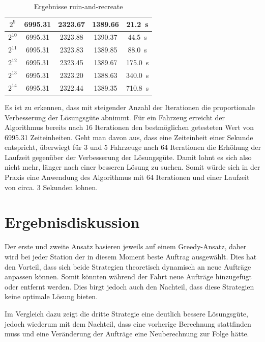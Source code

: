 \documentclass[ngerman]{tudscrreprt}
\begin{document}
\begin{table}[H]
\begin{tabular}{|c|c|c|c|c|}
    $2^9$                           & \num{6995.31} & \num{2323.67} & \num{1389.66} & \SI{21.2}{\s}        \\ \hline
    $2^{10}$                        & \num{6995.31} & \num{2323.88} & \num{1390.37} & \SI{44.5}{\s}        \\ \hline
    $2^{11}$                        & \num{6995.31} & \num{2323.83} & \num{1389.85} & \SI{88.0}{\s}        \\ \hline
    $2^{12}$                        & \num{6995.31} & \num{2323.45} & \num{1389.67} & \SI{175.0}{\s}       \\ \hline
    $2^{13}$                        & \num{6995.31} & \num{2323.20} & \num{1388.63} & \SI{340.0}{\s}       \\ \hline
    $2^{14}$                        & \num{6995.31} & \num{2322.44} & \num{1389.35} & \SI{710.8}{\s}       \\ \hline
    \end{tabular}
    \caption{Ergebnisse ruin-and-recreate}
    \label{table:ruin-and-recreate}
\end{table}
%
Es ist zu erkennen, dass mit steigender Anzahl der Iterationen die proportionale Verbesserung der Lösungsgüte abnimmt.
Für ein Fahrzeug erreicht der Algorithmus bereits nach 16 Iterationen den bestmöglichen getesteten Wert von \num{6995.31}
Zeiteinheiten. Geht man davon aus, dass eine Zeiteinheit einer Sekunde entspricht, überwiegt für 3 und 5 Fahrzeuge
nach 64 Iterationen die Erhöhung der Laufzeit gegenüber der Verbesserung der Lösungsgüte. Damit lohnt es sich also
nicht mehr, länger nach einer besseren Lösung zu suchen. Somit würde sich in der Praxis eine Anwendung des Algorithmus
mit 64 Iterationen und einer Laufzeit von circa. 3 Sekunden lohnen.

\section{Ergebnisdiskussion}
Der erste und zweite Ansatz basieren jeweils auf einem Greedy-Ansatz, daher wird bei
jeder Station der in diesem Moment beste Auftrag ausgewählt. Dies hat den Vorteil, dass
sich beide Strategien theoretisch dynamisch an neue Aufträge anpassen können. Somit
könnten während der Fahrt neue Aufträge hinzugefügt oder entfernt werden. Dies birgt
jedoch auch den Nachteil, dass diese Strategien keine optimale Lösung bieten.

Im Vergleich dazu zeigt die dritte Strategie eine deutlich bessere Lösungsgüte,
jedoch wiederum mit dem Nachteil, dass eine vorherige Berechnung stattfinden muss und eine
Veränderung der Aufträge eine Neuberechnung zur Folge hätte.
\end{document}

